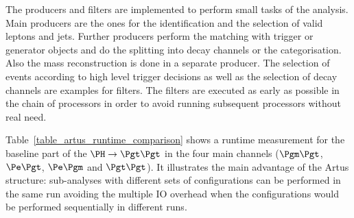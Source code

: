 \documentclass[a4paper, oneside, 10pt]{scrartcl}
\begin{document}
The producers and filters are implemented to perform small tasks of the analysis. Main producers are the ones for the identification and the selection of valid leptons and jets. Further producers perform the matching with trigger or generator objects and do the splitting into decay channels or the categorisation. Also the mass reconstruction is done in a separate producer. The selection of events according to high level trigger decisions as well as the selection of decay channels are examples for filters. The filters are executed as early as possible in the chain of processors in order to avoid running subsequent processors without real need.

Table~\ref{table_artus_runtime_comparison} shows a runtime measurement for the baseline part of the $\PH\to\Pgt\Pgt$ in the four main channels ($\Pgm\Pgt$, $\Pe\Pgt$, $\Pe\Pgm$ and $\Pgt\Pgt$). It illustrates the main advantage of the Artus structure: sub-analyses with different sets of configurations can be performed in the same run avoiding the multiple IO overhead when the configurations would be performed sequentially in different runs.
\end{document}
